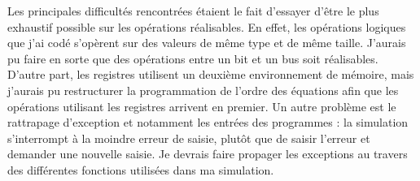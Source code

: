 \documentclass{article}
\begin{document}
Les principales difficultés rencontrées étaient le fait d'essayer d'être le plus exhaustif possible sur les opérations réalisables. En effet, les opérations logiques que j'ai codé s'opèrent sur des valeurs de même type et de même taille. J'aurais pu faire en sorte que des opérations entre un bit et un bus soit réalisables. D'autre part, les registres utilisent un deuxième environnement de mémoire, mais j'aurais pu restructurer la programmation de l'ordre des équations afin que les opérations utilisant les registres arrivent en premier. Un autre problème est le rattrapage d'exception et notamment les entrées des programmes : la simulation s'interrompt à la moindre erreur de saisie, plutôt que de saisir l'erreur et demander une nouvelle saisie. Je devrais faire propager les exceptions au travers des différentes fonctions utilisées dans ma simulation.
\end{document}
